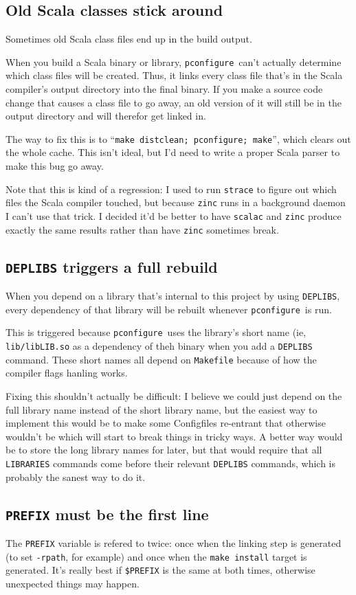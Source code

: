 \documentclass{article}
\newcommand{\pconfigure}{\texttt{pconfigure}}
\begin{document}
\subsection{Old Scala classes stick around}

Sometimes old Scala class files end up in the build output.

When you build a Scala binary or library, \pconfigure\ can't actually
determine which class files will be created.  Thus, it links every
class file that's in the Scala compiler's output directory into the
final binary.  If you make a source code change that causes a class
file to go away, an old version of it will still be in the output
directory and will therefor get linked in.

The way to fix this is to ``\texttt{make distclean; pconfigure;
  make}'', which clears out the whole cache.  This isn't ideal, but
I'd need to write a proper Scala parser to make this bug go away.

Note that this is kind of a regression: I used to run \texttt{strace}
to figure out which files the Scala compiler touched, but because
\texttt{zinc} runs in a background daemon I can't use that trick.  I
decided it'd be better to have \texttt{scalac} and \texttt{zinc}
produce exactly the same results rather than have \texttt{zinc}
sometimes break.

\subsection{\texttt{DEPLIBS} triggers a full rebuild}

When you depend on a library that's internal to this project by using
\texttt{DEPLIBS}, every dependency of that library will be rebuilt
whenever \pconfigure\ is run.

This is triggered because \pconfigure\ uses the library's short name
(ie, \texttt{lib/libLIB.so} as a dependency of theh binary when you
add a \texttt{DEPLIBS} command.  These short names all depend on
\texttt{Makefile} because of how the compiler flags hanling works.

Fixing this shouldn't actually be difficult: I believe we could just
depend on the full library name instead of the short library name, but
the easiest way to implement this would be to make some Configfiles
re-entrant that otherwise wouldn't be which will start to break things
in tricky ways.  A better way would be to store the long library names
for later, but that would require that all \texttt{LIBRARIES} commands
come before their relevant \texttt{DEPLIBS} commands, which is
probably the sanest way to do it.

\subsection{\texttt{PREFIX} must be the first line \label{err::prefix}}

The \texttt{PREFIX} variable is refered to twice: once when the
linking step is generated (to set \texttt{-rpath}, for example) and
once when the \texttt{make install} target is generated.  It's really
best if \texttt{\$PREFIX} is the same at both times, otherwise
unexpected things may happen.
\end{document}
